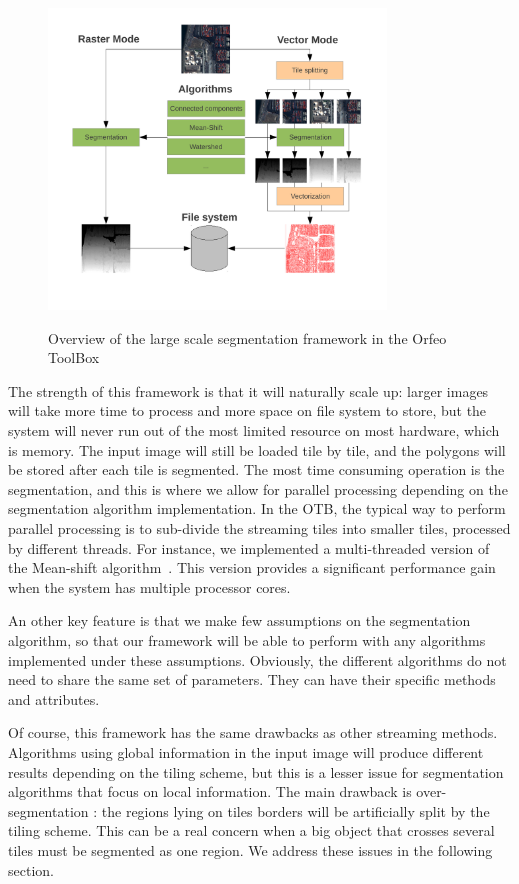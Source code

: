 \documentclass{josis}
\begin{document}
\begin{figure}[!htb]
\centering
\includegraphics[width=0.8\textwidth]{Pictures/schema_ogrs}\label{fig:overview}
\caption{Overview of the large scale segmentation framework in the Orfeo ToolBox}\label{fig:framework}
\end{figure} 

The strength of this framework is that it will naturally scale up:
larger images will take more time to process and more space on file
system to store, but the system will never run out of the most limited
resource on most hardware, which is memory. The input image will still
be loaded tile by tile, and the polygons will be stored after each
tile is segmented. The most time consuming operation is the
segmentation, and this is where we allow for parallel processing
depending on the segmentation algorithm implementation. In the OTB,
the typical way to perform parallel processing is to sub-divide the
streaming tiles into smaller tiles, processed by different
threads. For instance, we implemented a multi-threaded version of the
Mean-shift algorithm~\cite{comaniciu2002mean}. This version provides a
significant performance gain when the system has multiple processor
cores.

An other key feature is that we make few assumptions on the segmentation
algorithm, so that our framework will be able to perform with any algorithms
implemented under these assumptions. Obviously, the different algorithms do not
need to share the same set of parameters. They can have their specific methods
and attributes.

Of course, this framework has the same drawbacks as other streaming
methods. Algorithms using global information in the input image will
produce different results depending on the tiling scheme, but this is
a lesser issue for segmentation algorithms that focus on local
information. The main drawback is over-segmentation : the regions
lying on tiles borders will be artificially split by the tiling
scheme. This can be a real concern when a big object that crosses
several tiles must be segmented as one region. We address these
issues in the following section.
\end{document}
